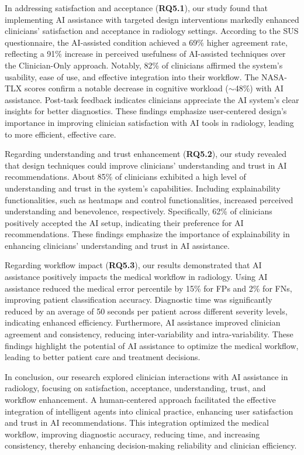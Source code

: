 \textcolor{revised}{In addressing satisfaction and acceptance ({\bf RQ5.1}), our study found that implementing \ac{AI} assistance with targeted design interventions markedly enhanced clinicians' satisfaction and acceptance in radiology settings.
According to the \ac{SUS} questionnaire, the \ac{AI}-assisted condition achieved a 69\% higher agreement rate, reflecting a 91\% increase in perceived usefulness of \ac{AI}-assisted techniques over the Clinician-Only approach.
Notably, 82\% of clinicians affirmed the system's usability, ease of use, and effective integration into their workflow.
The \ac{NASA-TLX} scores confirm a notable decrease in cognitive workload ($\sim$48\%) with \ac{AI} assistance.
Post-task feedback indicates clinicians appreciate the \ac{AI} system's clear insights for better diagnostics.
These findings emphasize user-centered design's importance in improving clinician satisfaction with \ac{AI} tools in radiology, leading to more efficient, effective care.}

Regarding understanding and trust enhancement ({\bf RQ5.2}), our study revealed that design techniques could improve clinicians' understanding and trust in \ac{AI} recommendations.
About 85\% of clinicians exhibited a high level of understanding and trust in the system's capabilities.
Including explainability functionalities, such as heatmaps and control functionalities, increased perceived understanding and benevolence, respectively.
Specifically, 62\% of clinicians positively accepted the \ac{AI} setup, indicating their preference for \ac{AI} recommendations.
These findings emphasize the importance of explainability in enhancing clinicians' understanding and trust in \ac{AI} assistance.

Regarding workflow impact ({\bf RQ5.3}), our results demonstrated that \ac{AI} assistance positively impacts the medical workflow in radiology.
Using \ac{AI} assistance reduced the medical error percentile by 15\% for \acp{FP} and 2\% for \acp{FN}, improving patient classification accuracy.
Diagnostic time was significantly reduced by an average of 50 seconds per patient across different severity levels, indicating enhanced efficiency.
Furthermore, \ac{AI} assistance improved clinician agreement and consistency, reducing inter-variability and intra-variability.
These findings highlight the potential of \ac{AI} assistance to optimize the medical workflow, leading to better patient care and treatment decisions.

\textcolor{revised}{In conclusion, our research explored clinician interactions with \ac{AI} assistance in radiology, focusing on satisfaction, acceptance, understanding, trust, and workflow enhancement.
A human-centered approach facilitated the effective integration of intelligent agents into clinical practice, enhancing user satisfaction and trust in \ac{AI} recommendations.
This integration optimized the medical workflow, improving diagnostic accuracy, reducing time, and increasing consistency, thereby enhancing decision-making reliability and clinician efficiency.}

